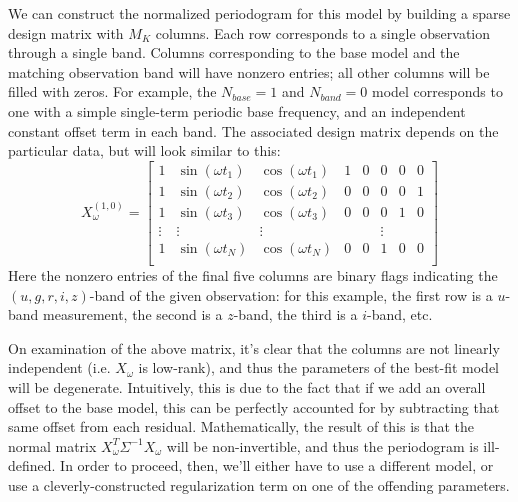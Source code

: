 \documentclass[12pt,preprint]{aastex}
\begin{document}
We can construct the normalized periodogram for this model by building a sparse design matrix with $M_K$ columns. Each row corresponds to a single observation through a single band. Columns corresponding to the base model and the matching observation band will have nonzero entries; all other columns will be filled with zeros. For example, the $N_{base}=1$ and $N_{band}=0$ model corresponds to one with a simple single-term periodic base frequency, and an independent constant offset term in each band. The associated design matrix depends on the particular data, but will look similar to this:
\begin{equation}
X_\omega^{(1,0)} = \left[
\begin{array}{cccccccc}
1 & \sin(\omega t_1) & \cos(\omega t_1) & 1 & 0 & 0 & 0 & 0\\
1 & \sin(\omega t_2) & \cos(\omega t_2) & 0 & 0 & 0 & 0 & 1\\
1 & \sin(\omega t_3) & \cos(\omega t_3) & 0 & 0 & 0 & 1 & 0\\
\vdots & \vdots & \vdots & & & \vdots & &\\
1 & \sin(\omega t_N) & \cos(\omega t_N) & 0 & 0 & 1 & 0 & 0\\
\end{array}
\right]
\end{equation}
Here the nonzero entries of the final five columns are binary flags indicating the $(u, g, r, i, z)$-band of the given observation: for this example, the first row is a $u$-band measurement, the second is a $z$-band, the third is a $i$-band, etc.

On examination of the above matrix, it's clear that the columns are not linearly independent (i.e. $X_\omega$ is low-rank), and thus the parameters of the best-fit model will be degenerate. Intuitively, this is due to the fact that if we add an overall offset to the base model, this can be perfectly accounted for by subtracting that same offset from each residual. Mathematically, the result of this is that the normal matrix $X_\omega^T\Sigma^{-1}X_\omega$ will be non-invertible, and thus the periodogram is ill-defined. In order to proceed, then, we'll either have to use a different model, or use a cleverly-constructed regularization term on one of the offending parameters.
\end{document}
